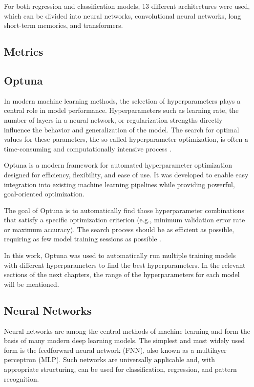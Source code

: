 For both regression and classification models, 13 different architectures were used, which can be divided into neural networks, convolutional neural networks, long short-term memories, and transformers.

\subsection{Metrics}


\subsection{Optuna}

In modern machine learning methods, the selection of hyperparameters plays a central role in model performance.
Hyperparameters such as learning rate, the number of layers in a neural network, or regularization strengths directly influence the behavior and generalization of the model.
The search for optimal values for these parameters, the so-called hyperparameter optimization, is often a time-consuming and computationally intensive process \cite{hyperparameter-importance}.

Optuna is a modern framework for automated hyperparameter optimization designed for efficiency, flexibility, and ease of use.
It was developed to enable easy integration into existing machine learning pipelines while providing powerful, goal-oriented optimization.

The goal of Optuna is to automatically find those hyperparameter combinations that satisfy a specific optimization criterion (e.g., minimum validation error rate or maximum accuracy).
The search process should be as efficient as possible, requiring as few model training sessions as possible \cite{optuna-hyperparameters}.

In this work, Optuna was used to automatically run multiple training models with different hyperparameters to find the best hyperparameters.
In the relevant sections of the next chapters, the range of the hyperparameters for each model will be mentioned.

\subsection{Neural Networks}
\label{chap:nn}

Neural networks are among the central methods of machine learning and form the basis of many modern deep learning models.
The simplest and most widely used form is the feedforward neural network (FNN), also known as a multilayer perceptron (MLP).
Such networks are universally applicable and, with appropriate structuring, can be used for classification, regression, and pattern recognition.

